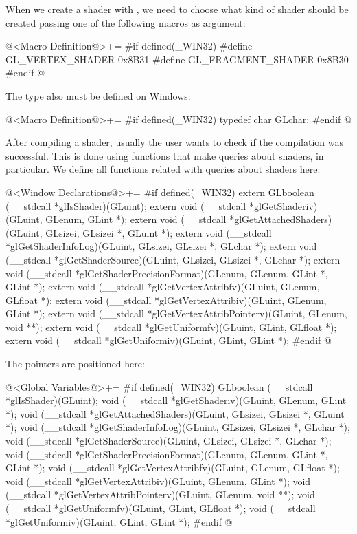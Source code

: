 When we create a shader with , we need to
choose what kind of shader should be created passing one of the
following macros as argument:

\iniciocodigo
@<Macro Definition@>+=
#if defined(_WIN32)
#define GL_VERTEX_SHADER          0x8B31
#define GL_FRAGMENT_SHADER        0x8B30
#endif
@
\fimcodigo

The type  also must be defined on Windows:

\iniciocodigo
@<Macro Definition@>+=
#if defined(_WIN32)
typedef char GLchar;
#endif
@
\fimcodigo


After compiling a shader, usually the user wants to check if the
compilation was successful. This is done using functions that make
queries about shaders,  in particular. We
define all functions related with queries about shaders here:

\iniciocodigo
@<Window Declarations@>+=
#if defined(_WIN32)
extern GLboolean (__stdcall *glIsShader)(GLuint);
extern void (__stdcall *glGetShaderiv)(GLuint, GLenum, GLint *);
extern void (__stdcall *glGetAttachedShaders)(GLuint, GLsizei, GLsizei *,
                                              GLuint *);
extern void (__stdcall *glGetShaderInfoLog)(GLuint, GLsizei, GLsizei *, GLchar *);
extern void (__stdcall *glGetShaderSource)(GLuint, GLsizei, GLsizei *, GLchar *);
extern void (__stdcall *glGetShaderPrecisionFormat)(GLenum, GLenum, GLint *,
                                                    GLint *);
extern void (__stdcall *glGetVertexAttribfv)(GLuint, GLenum, GLfloat *);
extern void (__stdcall *glGetVertexAttribiv)(GLuint, GLenum, GLint *);
extern void (__stdcall *glGetVertexAttribPointerv)(GLuint, GLenum, void **);
extern void (__stdcall *glGetUniformfv)(GLuint, GLint, GLfloat *);
extern void (__stdcall *glGetUniformiv)(GLuint, GLint, GLint *);
#endif
@
\fimcodigo

The pointers are positioned here:

\iniciocodigo
@<Global Variables@>+=
#if defined(_WIN32)
GLboolean (__stdcall *glIsShader)(GLuint);
void (__stdcall *glGetShaderiv)(GLuint, GLenum, GLint *);
void (__stdcall *glGetAttachedShaders)(GLuint, GLsizei, GLsizei *, GLuint *);
void (__stdcall *glGetShaderInfoLog)(GLuint, GLsizei, GLsizei *, GLchar *);
void (__stdcall *glGetShaderSource)(GLuint, GLsizei, GLsizei *, GLchar *);
void (__stdcall *glGetShaderPrecisionFormat)(GLenum, GLenum, GLint *, GLint *);
void (__stdcall *glGetVertexAttribfv)(GLuint, GLenum, GLfloat *);
void (__stdcall *glGetVertexAttribiv)(GLuint, GLenum, GLint *);
void (__stdcall *glGetVertexAttribPointerv)(GLuint, GLenum, void **);
void (__stdcall *glGetUniformfv)(GLuint, GLint, GLfloat *);
void (__stdcall *glGetUniformiv)(GLuint, GLint, GLint *);
#endif
@
\fimcodigo

